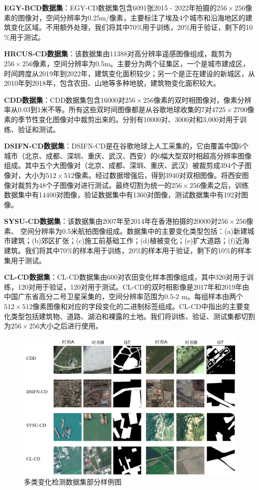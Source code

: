 \documentclass[lang=chs, degree=master, blindreview=false, adobe=false]{yanputhesis}
\begin{document}
\textbf{EGY-BCD数据集}：EGY-CD数据集包含6091张2015 - 2022年拍摄的$256 \times 256$像素的图像对，空间分辨率为0.25m/像素，主要标注了埃及4个城市和沿海地区的建筑变化区域。不用额外处理，我们将其中70$\%$用于训练，20$\%$用于验证，剩下的10$\%$用于测试。

\textbf{HRCUS-CD数据集}：该数据集由11388对高分辨率遥感图像组成，裁剪为$256 \times 256$像素，空间分辨率为0.5m。主要分为两个征集区，一个是城市建成区，时间跨度从2019年到2022年，建筑变化面积较少；另一个是正在建设的新城区，从2010年到2018年，包含农田、山地等多种地貌，建筑物变化面积较大。

\textbf{CDD数据集}：CDD数据集包含16000对$256\times256$像素的双时相图像对，像素分辨率从0.03到1米不等。所有这些双时间图像都是从谷歌地球收集的7对$4725\times2700$像素的季节性变化图像对中裁剪出来的。分别有10000对、3000对和3,000对用于训练、验证和测试。

\textbf{DSIFN-CD数据集}：DSIFN-CD是在谷歌地球上人工采集的，它由覆盖中国6个城市（北京、成都、深圳、重庆、武汉、西安）的6幅大型双时相超高分辨率图像组成。其中五个大图像对（北京、成都、深圳、重庆、武汉）被裁剪成394个子图像对，大小为$512\times512$像素。经过数据增强后，得到3940对双相图像。将西安图像对裁剪为48个子图像对进行测试。最终切割为统一的$256\times256$像素之后，训练数据集中有14400对图像，验证数据集中有1360对图像，测试数据集中有192对图像。

\textbf{SYSU-CD数据集}：该数据集由2007年至2014年在香港拍摄的20000对$256\times256$像素、 空间分辨率为0.5米航拍图像组成。数据集中的主要变化类型包括：(a)新建城市建筑；(b)郊区扩张；(c)施工前基础工作；(d)植被变化；(e)扩大道路；(f)近海建筑。我们将其中70$\%$的样本用于训练，20$\%$的样本用于验证，剩下的10$\%$的样本集用于测试。

\textbf{CL-CD数据集}：CL-CD数据集由600对农田变化样本图像组成，其中320对用于训练，120对用于验证，120对用于测试。CL-CD的双时相影像是2017年和2019年由中国广东省高分二号卫星采集的，空间分辨率范围为0.5-2 m。每组样本由两个$512 \times 512$像素图像和对应的字段变化的二进制标签组成。CL-CD中指出的主要变化类型包括建筑物、道路、湖泊和裸露的土地。我们将训练、验证、测试集都切割为$256\times256$大小之后进行使用。
\begin{figure}[!htb]
  \centering
  \includegraphics[scale=0.65]{images/mutil_sample.png}
  \caption{
    多类变化检测数据集部分样例图
  }
  \label{fig:mutil_sample}
\end{figure}
\end{document}
